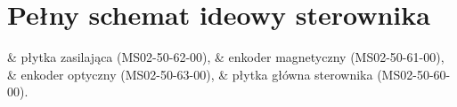 \renewcommand\thesection{\Alph{section}}
\setcounter{section}{0}

\section{Pełny schemat ideowy sterownika}
\label{s:attachmenta}

\begin{easylist}
	& płytka zasilająca (MS02-50-62-00),
	& enkoder magnetyczny (MS02-50-61-00),
	& enkoder optyczny (MS02-50-63-00),
	& płytka główna sterownika (MS02-50-60-00).
\end{easylist}	






\clearpage